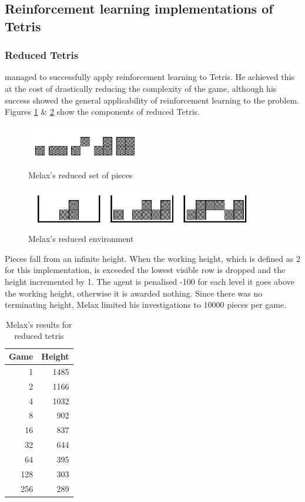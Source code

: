 \documentclass[a4paper]{article}%
\begin{document}
\subsection{Reinforcement learning implementations of Tetris}
\subsubsection{Reduced Tetris}
\cite{melaxtetris} managed to successfully apply reinforcement learning to Tetris. He achieved this at the cost of drastically reducing the complexity of the game, although his success showed the general applicability of reinforcement learning to the problem. Figures \ref{fig:melaxpiece} \& \ref{fig:melaxenv} show the components of reduced Tetris. 

\begin{figure}[h]
\centering
\includegraphics[width=2in]{melaxpieces.jpg}
\caption{Melax's reduced set of pieces}
\label{fig:melaxpiece}
\end{figure}

\begin{figure}[h]
\centering
\includegraphics[width=4in]{melaxstates.jpg}
\caption{Melax's reduced environment}
\label{fig:melaxenv}
\end{figure}

Pieces fall from an infinite height. When the working height, which is defined as 2 for this implementation, is exceeded the lowest visible row is dropped and the height incremented by 1. The agent is penalised  -100 for each level it goes above the working height, otherwise it is awarded nothing. Since there was no terminating height, Melax limited his investigations to 10000 pieces per game.

\begin{table}[h]
\centering
\begin{tabular}{|r|r|}
\hline
Game & Height  \\
\hline
    1 &  1485 \\
     2  & 1166 \\
     4  & 1032 \\
     8  &  902 \\
    16  &  837 \\
    32  &  644 \\
    64  &  395 \\
   128  &  303 \\
   256   & 289 \\
\hline
\end{tabular}
\caption{Melax's results for reduced tetris}
\label{mresults}
\end{table}
\end{document}
